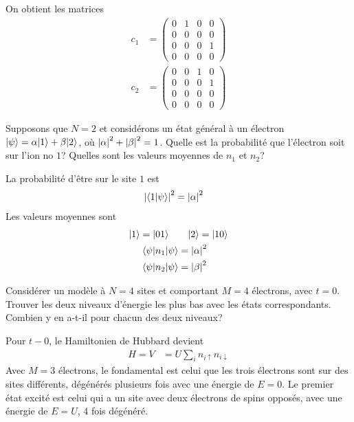 \documentclass{subfiles}[../main.tex]
\begin{document}
            On obtient les matrices
            \begin{align}
                c_1&=\begin{pmatrix}
                    0&1&0&0\\
                    0&0&0&0\\
                    0&0&0&1\\
                    0&0&0&0
                \end{pmatrix}\\
                c_2&=\begin{pmatrix}
                    0&0&1&0\\
                    0&0&0&1\\
                    0&0&0&0\\
                    0&0&0&0
                \end{pmatrix}
            \end{align}

            \begin{problem}
                Supposons que $N=2$ et
            considérons un état général à un électron
            $|{\psi}\rangle=\alpha|{1}\rangle+\beta|{2}\rangle$,
            où $\abs{\alpha}^2+\abs{\beta}^2=1$. Quelle
            est la probabilité que l'électron soit sur
            l'ion no $1$? Quelles sont les valeurs moyennes
            de $n_1$ et $n_2$?
            \end{problem}
            La probabilité d'être sur le site $1$ est
            \begin{align}
                \abs{\langle{1}|{\psi}\rangle}^2&=\abs{\alpha}^2
            \end{align}
            Les valeurs moyennes sont
            \begin{align}
                |{1}\rangle=|{01}\rangle\quad&\quad|{2}\rangle=|{10}\rangle\\
                \langle{\psi}|n_1|{\psi}\rangle&=\abs{\alpha}^2\\
                \langle{\psi}|n_2|{\psi}\rangle&=\abs{\beta}^2
            \end{align}

            \begin{problem}
                Considérer un modèle
            à $N=4$ sites et comportant $M=4$ électrons,
            avec $t=0$. Trouver les deux niveaux d'énergie
            les plus bas avec les états correspondants.
            Combien y en a-t-il pour chacun des deux
            niveaux?
            \end{problem}
            Pour $t-0$, le Hamiltonien de Hubbard devient
            \begin{align}
                H=V&=U\sum_{i}n_{i\uparrow}n_{i\downarrow}
            \end{align}
            Avec $M=3$ électrons, le fondamental est celui que les trois
            électrons sont sur des sites différents, dégénérés plusieurs fois
            avec une énergie de $E=0$. Le premier état excité est celui qui
            a un site avec deux électrons de spins opposés, avec une énergie de
            $E=U$, $4$ fois dégénéré.
\end{document}

